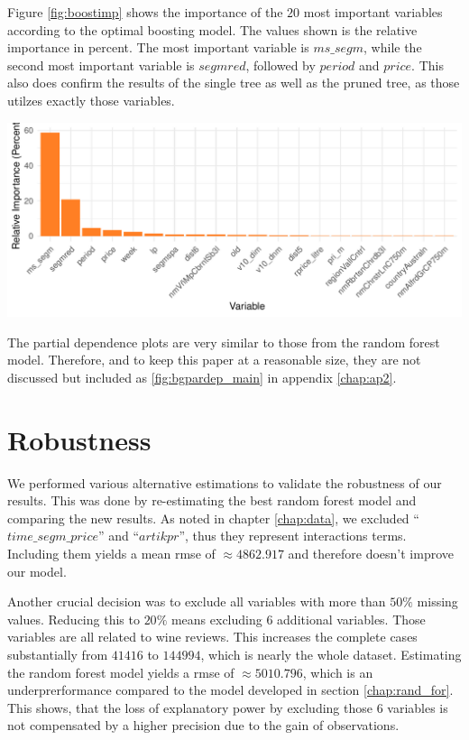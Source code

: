 \documentclass[11pt,]{article}
\let\origfigure\figure
\let\endorigfigure\endfigure
\renewenvironment{figure}[1][2] {
    \expandafter\origfigure\expandafter[H]
} {
    \endorigfigure
}
\begin{document}
Figure \ref{fig:boostimp} shows the importance of the \(20\) most
important variables according to the optimal boosting model. The values
shown is the relative importance in percent. The most important variable
is \(ms\_segm\), while the second most important variable is
\(segmred\), followed by \(period\) and \(price\). This also does
confirm the results of the single tree as well as the pruned tree, as
those utilzes exactly those variables.

\begin{figure}
\centering
\includegraphics{../00_data/output_paper/12_var_imp_boosting_bp.pdf}
\caption{\label{fig:boostimp}Boosting: Variable Importance Plot.}
\end{figure}

The partial dependence plots are very similar to those from the random
forest model. Therefore, and to keep this paper at a reasonable size,
they are not discussed but included as \ref{fig:bgpardep_main} in
appendix \ref{chap:ap2}.

\hypertarget{robustness}{%
\section{Robustness}\label{robustness}}

We performed various alternative estimations to validate the robustness
of our results. This was done by re-estimating the best random forest
model and comparing the new results. As noted in chapter
\ref{chap:data}, we excluded \enquote{\(time\_segm\_price\)} and
\enquote{\(artikpr\)}, thus they represent interactions terms. Including
them yields a mean \ac{rmse} of \(\approx4862.917\) and therefore
doesn't improve our model.

Another crucial decision was to exclude all variables with more than
\(50\%\) missing values. Reducing this to \(20\%\) means excluding \(6\)
additional variables. Those variables are all related to wine reviews.
This increases the complete cases substantially from \(41416\) to
\(144994\), which is nearly the whole dataset. Estimating the random
forest model yields a \ac{rmse} of \(\approx5010.796\), which is an
underprerformance compared to the model developed in section
\ref{chap:rand_for}. This shows, that the loss of explanatory power by
excluding those \(6\) variables is not compensated by a higher precision
due to the gain of observations.
\end{document}
